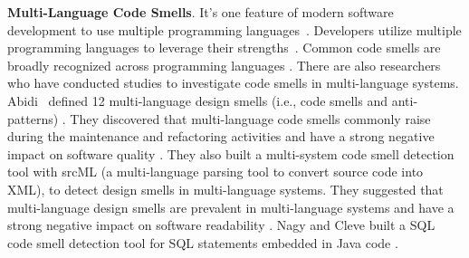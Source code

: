 
{\bf Multi-Language Code Smells}. It's one feature of modern software
development to use multiple programming languages~\cite{723183}. Developers
utilize multiple programming languages to leverage their
strengths~\cite{7476675}.
%
Common code smells are broadly recognized across programming languages
\cite{PMD,CheckStyle,Pysmell,Jscent,DesigniteJava}. There are also researchers
who have conducted studies to investigate code smells in multi-language
systems. Abidi~\etal{} defined 12 multi-language design smells (i.e., code
smells and anti-patterns) \cite{MultiLanguageCodeSmells}. They discovered that
multi-language code smells commonly raise during the maintenance and
refactoring activities and have a strong negative impact on software quality
\cite{Abidi2}. They also built a multi-system code smell detection tool with
srcML (a multi-language parsing tool to convert source code into XML), to
detect design smells in multi-language systems. They suggested that
multi-language design smells are prevalent in multi-language systems and have a
strong negative impact on software readability \cite{Fault-Prone}. Nagy and
Cleve built a SQL code smell detection tool for SQL statements embedded in Java
code \cite{SQLInJava}.
